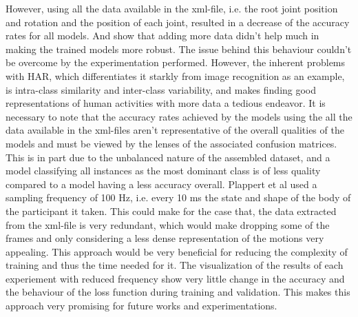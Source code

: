 		However, using all the data available in the xml-file, i.e. the root joint position and rotation and the position of each joint, resulted in a decrease of the accuracy rates for all models. And show that adding more data didn't help much in making the trained models more robust. The issue behind this behaviour couldn't be overcome by the experimentation performed. However, the inherent problems with HAR, which differentiates it starkly from image recognition as an example, is intra-class similarity and inter-class variability, and makes finding good representations of human activities with more data a tedious endeavor. It is necessary to note that the accuracy rates achieved by the models using the all the data available in the xml-files aren't representative of the overall qualities of the models and must be viewed by the lenses of the associated confusion matrices. This is in part due to the unbalanced nature of the assembled dataset, and a model classifying all instances as the most dominant class is of less quality compared to a model having a less accuracy overall.\newline
		Plappert et al used a sampling frequency of 100 Hz, i.e. every 10 ms the state and shape of the body of the participant it taken\cite{Plappert2016}. This could make for the case that, the data extracted from the xml-file is very redundant, which would make dropping some of the frames and only considering a less dense representation of the motions very appealing. This approach would be very beneficial for reducing the complexity of training and thus the time needed for it. The visualization of the results of each experiement with reduced frequency show very little change in the accuracy and the behaviour of the loss function during training and validation. This makes this approach very promising for future works and experimentations.
